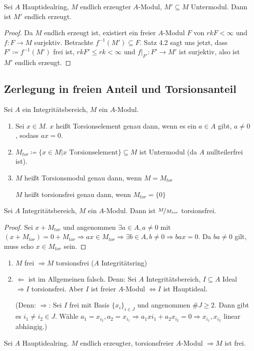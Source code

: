 \documentclass[12pt,a4paper]{scrartcl}
\theoremstyle{cplain}
\theoremstyle{cdef}
\begin{document}
\begin{kor}
	Sei $A$ Hauptidealring, $M$ endlich erzeugter $A$-Modul, $M'\subseteq M$ Untermodul. Dann ist $M'$ endlich erzeugt.
\end{kor}
\begin{proof}
	Da $M$ endlich erzeugt ist, existiert ein freier $A$-Modul $F$ von $rk F<\infty$ und $f\colon F\to M$ surjektiv. Betrachte $f^{-1}(M')\subseteq F$. Satz 4.2 sagt uns jetzt, dass $F'\coloneqq f^{-1}(M')$ frei ist, $rk F'\leq rk <\infty$ und $f|_{F'}\colon F'\to M'$ ist surjektiv, also ist $M'$ endlich erzeugt.
\end{proof}


\subsection{Zerlegung in freien Anteil und Torsionsanteil}
\begin{defi}
	Sei $A$ ein Integritätsbereich, $M$ ein $A$-Modul.
	\begin{enumerate}
		\item Sei $x\in M$. $x$ heißt Torsionselement genau dann, wenn es ein $a\in A$ gibt, $a\neq 0$, sodass $ax = 0$.
		\item $M_{tor} \coloneqq \{x\in M|x \text{ Torsionselement}\}\subseteq M$ ist Untermodul (da $A$ nullteilerfrei ist).
		\item $M$ heißt Torsionsmodul genau dann, wenn $M = M_{tor}$
	
			  $M$ heißt torsionsfrei genau dann, wenn $M_{tor} = \{0\}$
	\end{enumerate}
	
\end{defi}

\begin{lem}
	Sei $A$ Integritätsbereich, $M$ ein $A$-Modul. Dann ist $\nicefrac{M}{M_{tor}}$ torsionsfrei.
\end{lem}
\begin{proof}
	Sei $x+M_{tor}$ und angenommen $\exists a\in A, a\neq 0$ mit $(x+M_{tor}) = 0+M_{tor}\Rightarrow ax\in M_{tor}\Rightarrow \exists b\in A, b\neq 0\Rightarrow bax = 0$. Da $ba\neq 0$ gilt, muss scho $x\in M_{tor}$ sein.
\end{proof}

\begin{bem}
	\leavevmode
	\begin{enumerate}
		\item $M$ frei $\Rightarrow M$ torsionsfrei ($A$ Integritätsring)
		\item $\Leftarrow$ ist im Allgemeinen falsch. Denn: Sei $A$ Integritätsbereich, $I\subseteq A$ Ideal $\Rightarrow I$ torsionsfrei. Aber $I$ ist freier $A$-Modul $\Leftrightarrow I$ ist Hauptideal.
	
		(Denn: \glqq$\Rightarrow$\grqq: Sei $I$ frei mit Basis $\{x_i\}_{i\in J}$ und angenommen $\#J\geq 2$. Dann gibt es $i_1\neq i_2\in J$. Wähle $a_1 = x_{i_2}, a_2 = x_{i_1}\Rightarrow a_1x{i_1}+a_2x_{i_2} = 0\Rightarrow x_{i_1}, x_{i_2}$ linear abhängig.)
	\end{enumerate}
\end{bem}

\begin{lem}
	Sei $A$ Hauptidealring. $M$ endlich erzeugter, torsionsfreier $A$-Modul $\Rightarrow M$ ist frei.
\end{lem}
\end{document}
